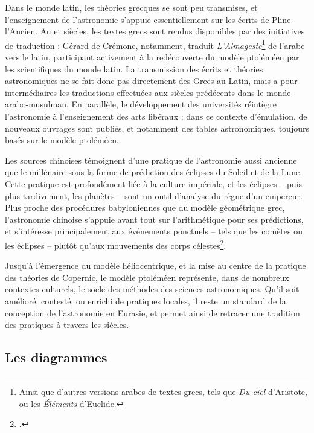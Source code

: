 Dans le monde latin, les théories grecques se sont peu transmises, et l'enseignement de l'astronomie s'appuie essentiellement sur les écrits de Pline l'Ancien. Au \xii et \xiii siècles, les textes grecs sont rendus disponibles par des initiatives de traduction : Gérard de Crémone, notamment, traduit \textit{L'Almageste}\footnote{Ainsi que d'autres versions arabes de textes grecs, tels que \textit{Du ciel} d'Aristote, ou les \textit{Éléments} d'Euclide.} de l'arabe vers le latin, participant activement à la redécouverte du modèle ptoléméen par les scientifiques du monde latin. La transmission des écrits et théories astronomiques ne se fait donc pas directement des Grecs au Latin, mais a pour intermédiaires les traductions effectuées aux siècles prédécents dans le monde arabo-musulman. En parallèle, le développement des universités réintègre l'astronomie à l'enseignement des arts libéraux : dans ce contexte d'émulation, de nouveaux ouvrages sont publiés, et notamment des tables astronomiques, toujours basés sur le modèle ptoléméen.

Les sources chinoises témoignent d'une pratique de l'astronomie aussi ancienne que le \ii millénaire \jc sous la forme de prédiction des éclipses du Soleil et de la Lune. Cette pratique est profondément liée à la culture impériale, et les éclipses -- puis plus tardivement, les planètes -- sont un outil d'analyse du règne d'un empereur. Plus proche des procédures babyloniennes que du modèle géométrique grec, l'astronomie chinoise s'appuie avant tout sur l'arithmétique pour ses prédictions, et s'intéresse principalement aux événements ponctuels -- tels que les comètes ou les éclipses -- plutôt qu'aux mouvements des corps célestes\footcite{evansHistoryAstronomy}.

Jusqu'à l'émergence du modèle héliocentrique, et la mise au centre de la pratique des théories de Copernic, le modèle ptoléméen représente, dans de nombreux contextes culturels, le socle des méthodes des sciences astronomiques. Qu'il soit amélioré, contesté, ou enrichi de pratiques locales, il reste un standard de la conception de l'astronomie en Eurasie, et permet ainsi de retracer une tradition des pratiques à travers les siècles.

    \subsection{Les diagrammes}
